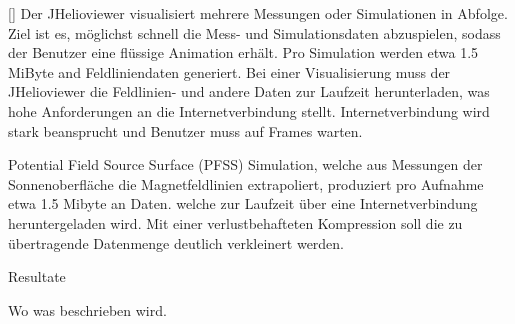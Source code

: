 [\baselineskip]
Der JHelioviewer visualisiert mehrere Messungen oder Simulationen in Abfolge. Ziel ist es, möglichst schnell die Mess- und Simulationsdaten abzuspielen, sodass der Benutzer eine flüssige Animation erhält. Pro Simulation werden etwa 1.5 MiByte and Feldliniendaten generiert. Bei einer Visualisierung muss der JHelioviewer die Feldlinien- und andere Daten zur Laufzeit herunterladen, was hohe Anforderungen an die Internetverbindung stellt.
Internetverbindung wird stark beansprucht und Benutzer muss auf Frames warten.

Potential Field Source Surface (PFSS) Simulation, welche aus Messungen der Sonnenoberfläche die Magnetfeldlinien extrapoliert, produziert pro Aufnahme etwa 1.5 Mibyte an Daten. welche zur Laufzeit über eine Internetverbindung heruntergeladen wird. Mit einer verlustbehafteten Kompression soll die zu übertragende Datenmenge deutlich verkleinert werden.

Resultate

Wo was beschrieben wird.